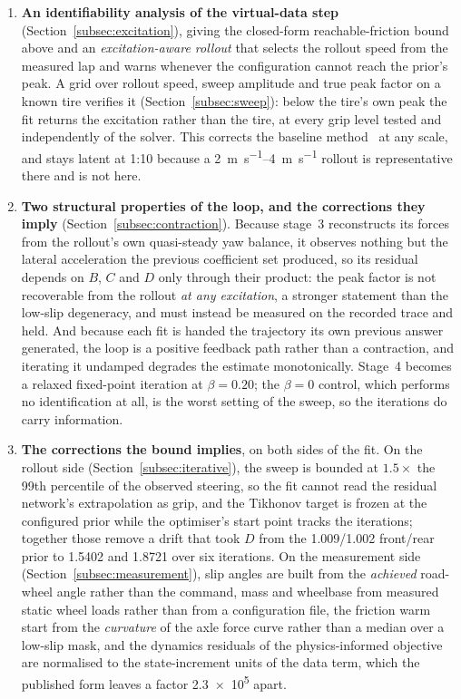 \begin{enumerate}
\item \textbf{An identifiability analysis of the virtual-data step}
(Section~\ref{subsec:excitation}), giving the closed-form reachable-friction
bound above and an \emph{excitation-aware rollout} that selects the rollout
speed from the measured lap and warns whenever the configuration cannot reach
the prior's peak. A grid over rollout speed, sweep amplitude and true peak
factor on a known tire verifies it (Section~\ref{subsec:sweep}): below the
tire's own peak the fit returns the excitation rather than the tire, at every
grip level tested and independently of the solver. This corrects the baseline
method~\cite{ontrack2025} at any scale, and stays latent at 1:10 because a
\SIrange{2}{4}{\meter\per\second} rollout is representative there and is not
here.

\item \textbf{Two structural properties of the loop, and the corrections they
imply} (Section~\ref{subsec:contraction}). Because stage~3 reconstructs its
forces from the rollout's own quasi-steady yaw balance, it observes nothing but
the lateral acceleration the previous coefficient set produced, so its residual
depends on $B$, $C$ and $D$ only through their product: the peak factor is not
recoverable from the rollout \emph{at any excitation}, a stronger statement
than the low-slip degeneracy, and must instead be measured on the recorded
trace and held. And because each fit is handed the trajectory its own previous
answer generated, the loop is a positive feedback path rather than a
contraction, and iterating it undamped degrades the estimate monotonically.
Stage~4 becomes a relaxed fixed-point iteration at $\beta=\num{0.20}$; the
$\beta=0$ control, which performs no identification at all, is the worst
setting of the sweep, so the iterations do carry information.

\item \textbf{The corrections the bound implies}, on both sides of the fit.
On the rollout side (Section~\ref{subsec:iterative}), the sweep is bounded at
$1.5\times$ the 99th percentile of the observed steering, so the fit cannot
read the residual network's extrapolation as grip, and the Tikhonov target is
frozen at the configured prior while the optimiser's start point tracks the
iterations; together those remove a drift that took $D$ from the
\num{1.009}/\num{1.002} front/rear prior to \num{1.5402} and \num{1.8721} over
six iterations. On the measurement side (Section~\ref{subsec:measurement}),
slip angles are built from the \emph{achieved} road-wheel angle rather than
the command, mass and wheelbase from measured static wheel loads rather than
from a configuration file, the friction warm start from the \emph{curvature} of
the axle force curve rather than a median over a low-slip mask, and the
dynamics residuals of the physics-informed objective are normalised to the
state-increment units of the data term, which the published form leaves a
factor \num{2.3e5} apart.


\end{enumerate}
